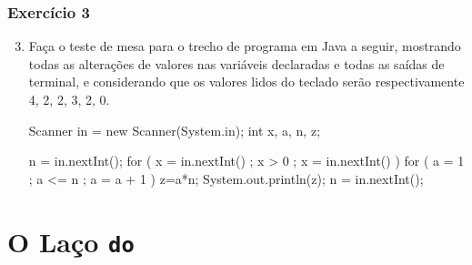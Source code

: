 \documentclass[xcolor={dvipsnames,table},aspectratio=169]{beamer}
\begin{document}
\begin{frame}[fragile]\frametitle{Exercício 3}
\begin{enumerate}
    \setcounter{enumi}{2}
    \item Faça o teste de mesa para o trecho de programa em Java a seguir, mostrando todas as alterações de valores nas variáveis declaradas e todas as saídas de terminal, e considerando que os valores lidos do teclado serão respectivamente 4, 2, 2, 3, 2, 0.
{\scriptsize
\begin{javacode}
Scanner in = new Scanner(System.in);
int x, a, n, z;

n = in.nextInt();
for ( x = in.nextInt() ; x > 0 ; x = in.nextInt() ) {
   for ( a = 1 ; a <= n ; a = a + 1 ) {
      z=a*n;
      System.out.println(z);
   }
   n = in.nextInt();
}
\end{javacode}
}
\end{enumerate}
\end{frame}

\section{O Laço \texttt{do}}
\end{document}
